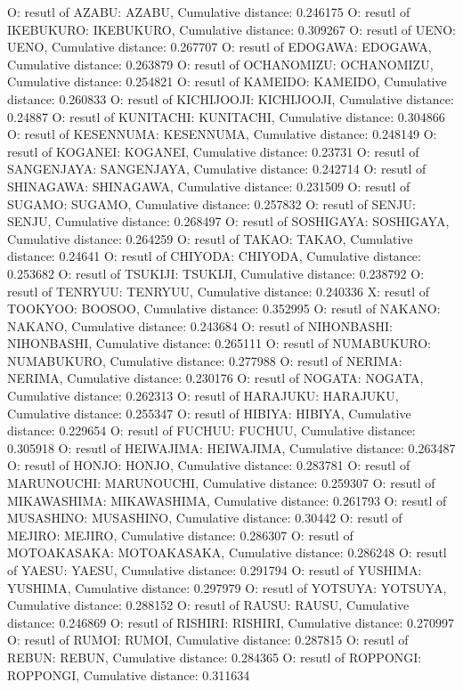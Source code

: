 O: resutl of AZABU: AZABU, Cumulative distance: 0.246175
O: resutl of IKEBUKURO: IKEBUKURO, Cumulative distance: 0.309267
O: resutl of UENO: UENO, Cumulative distance: 0.267707
O: resutl of EDOGAWA: EDOGAWA, Cumulative distance: 0.263879
O: resutl of OCHANOMIZU: OCHANOMIZU, Cumulative distance: 0.254821
O: resutl of KAMEIDO: KAMEIDO, Cumulative distance: 0.260833
O: resutl of KICHIJOOJI: KICHIJOOJI, Cumulative distance: 0.24887
O: resutl of KUNITACHI: KUNITACHI, Cumulative distance: 0.304866
O: resutl of KESENNUMA: KESENNUMA, Cumulative distance: 0.248149
O: resutl of KOGANEI: KOGANEI, Cumulative distance: 0.23731
O: resutl of SANGENJAYA: SANGENJAYA, Cumulative distance: 0.242714
O: resutl of SHINAGAWA: SHINAGAWA, Cumulative distance: 0.231509
O: resutl of SUGAMO: SUGAMO, Cumulative distance: 0.257832
O: resutl of SENJU: SENJU, Cumulative distance: 0.268497
O: resutl of SOSHIGAYA: SOSHIGAYA, Cumulative distance: 0.264259
O: resutl of TAKAO: TAKAO, Cumulative distance: 0.24641
O: resutl of CHIYODA: CHIYODA, Cumulative distance: 0.253682
O: resutl of TSUKIJI: TSUKIJI, Cumulative distance: 0.238792
O: resutl of TENRYUU: TENRYUU, Cumulative distance: 0.240336
X: resutl of TOOKYOO: BOOSOO, Cumulative distance: 0.352995
O: resutl of NAKANO: NAKANO, Cumulative distance: 0.243684
O: resutl of NIHONBASHI: NIHONBASHI, Cumulative distance: 0.265111
O: resutl of NUMABUKURO: NUMABUKURO, Cumulative distance: 0.277988
O: resutl of NERIMA: NERIMA, Cumulative distance: 0.230176
O: resutl of NOGATA: NOGATA, Cumulative distance: 0.262313
O: resutl of HARAJUKU: HARAJUKU, Cumulative distance: 0.255347
O: resutl of HIBIYA: HIBIYA, Cumulative distance: 0.229654
O: resutl of FUCHUU: FUCHUU, Cumulative distance: 0.305918
O: resutl of HEIWAJIMA: HEIWAJIMA, Cumulative distance: 0.263487
O: resutl of HONJO: HONJO, Cumulative distance: 0.283781
O: resutl of MARUNOUCHI: MARUNOUCHI, Cumulative distance: 0.259307
O: resutl of MIKAWASHIMA: MIKAWASHIMA, Cumulative distance: 0.261793
O: resutl of MUSASHINO: MUSASHINO, Cumulative distance: 0.30442
O: resutl of MEJIRO: MEJIRO, Cumulative distance: 0.286307
O: resutl of MOTOAKASAKA: MOTOAKASAKA, Cumulative distance: 0.286248
O: resutl of YAESU: YAESU, Cumulative distance: 0.291794
O: resutl of YUSHIMA: YUSHIMA, Cumulative distance: 0.297979
O: resutl of YOTSUYA: YOTSUYA, Cumulative distance: 0.288152
O: resutl of RAUSU: RAUSU, Cumulative distance: 0.246869
O: resutl of RISHIRI: RISHIRI, Cumulative distance: 0.270997
O: resutl of RUMOI: RUMOI, Cumulative distance: 0.287815
O: resutl of REBUN: REBUN, Cumulative distance: 0.284365
O: resutl of ROPPONGI: ROPPONGI, Cumulative distance: 0.311634
